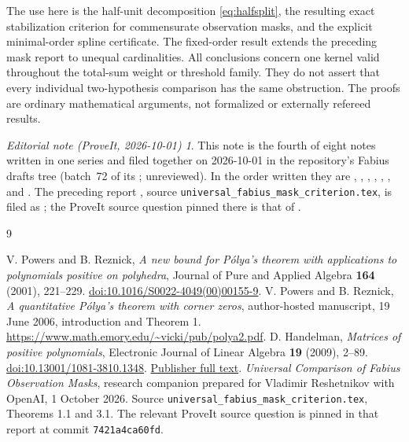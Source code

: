 \documentclass[11pt,a4paper]{article}
\theoremstyle{remark}\newtheorem*{ednote}{Editorial note (ProveIt, 2026-10-01)}
\begin{document}
The use here is the half-unit decomposition \eqref{eq:halfsplit}, the resulting exact stabilization criterion for commensurate observation masks, and the explicit minimal-order spline certificate. The fixed-order result extends the preceding mask report \cite{Masks} to unequal cardinalities. All conclusions concern one kernel valid throughout the total-sum weight or threshold family. They do not assert that every individual two-hypothesis comparison has the same obstruction. The proofs are ordinary mathematical arguments, not formalized or externally refereed results.
\begin{ednote}
This note is the fourth of eight notes written in one series and filed together on 2026-10-01 in the repository's Fabius drafts tree (batch~72 of its ; unreviewed). In the order written they are , , , , , ,  and . 
The preceding report \cite{Masks}, source
\texttt{universal\_fabius\_mask\_criterion.tex}, is filed as
; the ProveIt source question pinned
there is that of .
\end{ednote}

\begin{thebibliography}{9}\small\raggedright
\setlength{\itemsep}{3pt}\setlength{\parskip}{0pt}
 V. Powers and B. Reznick, \emph{A new bound for P\'olya's theorem with applications to polynomials positive on polyhedra}, Journal of Pure and Applied Algebra \textbf{164} (2001), 221--229. \href{https://doi.org/10.1016/S0022-4049(00)00155-9}{doi:10.1016/S0022-4049(00)00155-9}.
 V. Powers and B. Reznick, \emph{A quantitative P\'olya's theorem with corner zeros}, author-hosted manuscript, 19 June 2006, introduction and Theorem 1. \url{https://www.math.emory.edu/~vicki/pub/polya2.pdf}.
 D. Handelman, \emph{Matrices of positive polynomials}, Electronic Journal of Linear Algebra \textbf{19} (2009), 2--89. \href{https://doi.org/10.13001/1081-3810.1348}{doi:10.13001/1081-3810.1348}. \href{https://journals.uwyo.edu/index.php/ela/article/download/697/697/697}{Publisher full text}.
 \emph{Universal Comparison of Fabius Observation Masks}, research companion prepared for Vladimir Reshetnikov with OpenAI, 1 October 2026. Source \texttt{universal\_fabius\_mask\_criterion.tex}, Theorems 1.1 and 3.1. The relevant ProveIt source question is pinned in that report at commit \texttt{7421a4ca60fd}.
\end{thebibliography}
\end{document}

